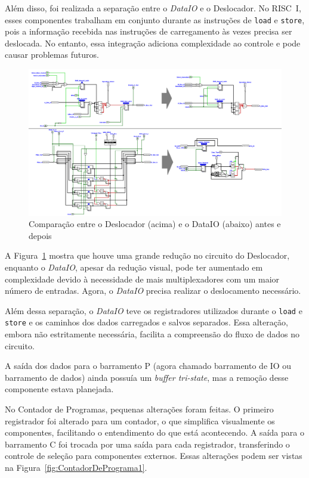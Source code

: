 \documentclass[
	12pt,				%
	openright,			%
	oneside,			%
	a4paper,			%
	english,			%
	french,				%
	spanish,			%
	brazil,				%
	]{abntex2}
\begin{document}
Além disso, foi realizada a separação entre o \textit{DataIO} e o Deslocador. No RISC~I, esses componentes trabalham em conjunto durante as instruções de \texttt{load} e \texttt{store}, pois a informação recebida nas instruções de carregamento às vezes precisa ser deslocada. No entanto, essa integração adiciona complexidade ao controle e pode causar problemas futuros. 

\begin{figure}[h]
    \centering
    \includegraphics[width=1\linewidth]{ProcessoDesenvolvimento/Arquitetura/ShifterIOoldnew.png}
    \caption{Comparação entre o Deslocador (acima) e o DataIO (abaixo) antes e depois}
    \label{fig:ShifterIOoldnew}
\end{figure}

A Figura~\ref{fig:ShifterIOoldnew} mostra que houve uma grande redução no circuito do Deslocador, enquanto o \textit{DataIO}, apesar da redução visual, pode ter aumentado em complexidade devido à necessidade de mais multiplexadores com um maior número de entradas. Agora, o \textit{DataIO} precisa realizar o deslocamento necessário.

Além dessa separação, o \textit{DataIO} teve os registradores utilizados durante o \texttt{load} e \texttt{store} e os caminhos dos dados carregados e salvos separados. Essa alteração, embora não estritamente necessária, facilita a compreensão do fluxo de dados no circuito.

A saída dos dados para o barramento P (agora chamado barramento de IO ou barramento de dados) ainda possuía um \textit{buffer tri-state}, mas a remoção desse componente estava planejada.

No Contador de Programas, pequenas alterações foram feitas. O primeiro registrador foi alterado para um contador, o que simplifica visualmente os componentes, facilitando o entendimento do que está acontecendo. A saída para o barramento C foi trocada por uma saída para cada registrador, transferindo o controle de seleção para componentes externos. Essas alterações podem ser vistas na Figura~\ref{fig:ContadorDePrograma1}.
\end{document}
